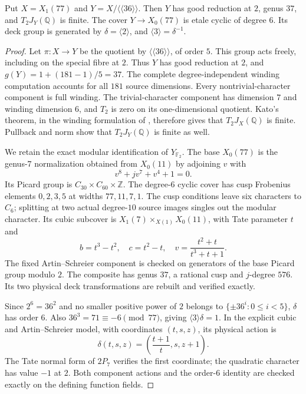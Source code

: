 \begin{lemma}\label{lem:decic77-geometry}
Put $X=X_1(77)$ and
$Y=X/\langle\langle36\rangle\rangle$.
Then $Y$ has good reduction at $2$, genus $37$, and
$T_2J_Y(\mathbb Q)$ is finite.
The cover $Y\to X_0(77)$ is etale cyclic of degree $6$.
Its deck group is generated by $\delta=\langle2\rangle$, and
$\langle3\rangle=\delta^{-1}$.
\end{lemma}
\begin{proof}
Let $\pi:X\to Y$ be the quotient by
$\langle\langle36\rangle\rangle$, of order $5$.
This group acts freely, including on the special fibre at $2$.
Thus $Y$ has good reduction at $2$, and
$g(Y)=1+(181-1)/5=37$.
The complete degree-independent winding computation accounts
for all $181$ source dimensions.
Every nontrivial-character component is full winding.
The trivial-character component has dimension $7$ and winding
dimension $6$, and $T_2$ is zero on its one-dimensional quotient.
Kato's theorem, in the winding formulation of
\cite[Remarks~3.2 and 3.3]{DEHMZ}, therefore gives that $T_2J_X(\mathbb Q)$ is finite.
Pullback and norm show that $T_2J_Y(\mathbb Q)$ is finite as well.

We retain the exact modular identification of $Y_{\mathbb F_2}$.
The base $X_0(77)$ is the genus-$7$ normalization obtained from
$X_0(11)$ by adjoining $v$ with
\[
 v^8+jv^7+v^4+1=0.
\]
Its Picard group is $C_{30}\times C_{60}\times\mathbb Z$.
The degree-$6$ cyclic cover has cusp Frobenius elements
$0,2,3,5$ at widths $77,11,7,1$.
The cusp conditions leave six characters to $C_6$; splitting
at two actual degree-$10$ source images singles out the modular
character.
Its cubic subcover is
$X_1(7)\times_{X(1)}X_0(11)$, with Tate parameter $t$ and
\[
 b=t^3-t^2,\quad c=t^2-t,\quad
 v=\frac{t^2+t}{t^3+t+1}.
\]
The fixed Artin--Schreier component is checked on generators of
the base Picard group modulo $2$.
The composite has genus $37$, a rational cusp and $j$-degree
$576$. Its two physical deck transformations are rebuilt and
verified exactly.


Since $2^6=36^2$ and no smaller positive power of $2$ belongs
to $\{\pm36^i:0\leq i<5\}$, $\delta$ has order $6$.
Also $36^3=71\equiv-6\pmod{77}$, giving
$\langle3\rangle\delta=1$.
In the explicit cubic and Artin--Schreier model, with coordinates
$(t,s,z)$, its physical action is
\[
 \delta(t,s,z)=\left(\frac{t+1}{t},s,z+1\right).
\]
The Tate normal form of $2P_7$ verifies the first coordinate;
the quadratic character has value $-1$ at $2$.
Both component actions and the order-$6$ identity are checked
exactly on the defining function fields.
\end{proof}
